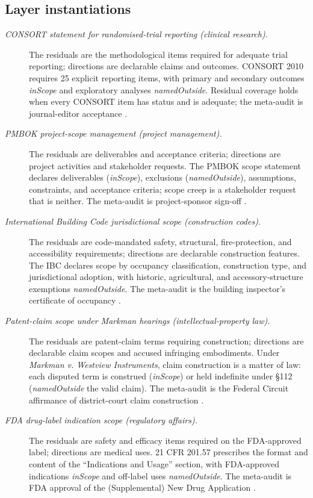 \documentclass[11pt]{article}
\theoremstyle{definition}
\begin{document}
\subsection*{Layer instantiations}\label{layer-inst:F52}

\begin{description}
\item[\emph{{CONSORT} statement for randomised-trial
reporting (clinical research).}]
The residuals are the methodological items required
for adequate trial reporting; directions are
declarable claims and outcomes.  CONSORT 2010
requires 25 explicit reporting items, with primary
and secondary outcomes \emph{inScope} and
exploratory analyses \emph{namedOutside}.  Residual
coverage holds when every CONSORT item has status
and is adequate; the meta-audit is journal-editor
acceptance \citep{Schulz2010CONSORT}.

\item[\emph{{PMBOK} project-scope management
(project management).}]
The residuals are deliverables and acceptance
criteria; directions are project activities and
stakeholder requests.  The PMBOK scope statement
declares deliverables (\emph{inScope}), exclusions
(\emph{namedOutside}), assumptions, constraints,
and acceptance criteria; scope creep is a
stakeholder request that is neither.  The
meta-audit is project-sponsor sign-off
\citep{PMI2017PMBOK}.

\item[\emph{International Building Code
jurisdictional scope (construction codes).}]
The residuals are code-mandated safety,
structural, fire-protection, and accessibility
requirements; directions are declarable
construction features.  The IBC declares scope by
occupancy classification, construction type, and
jurisdictional adoption, with historic, agricultural,
and accessory-structure exemptions
\emph{namedOutside}.  The meta-audit is the
building inspector's certificate of occupancy
\citep{ICC2021IBC}.

\item[\emph{Patent-claim scope under {M}arkman
hearings (intellectual-property law).}]
The residuals are patent-claim terms requiring
construction; directions are declarable claim
scopes and accused infringing embodiments.  Under
\emph{Markman v. Westview Instruments}, claim
construction is a matter of law: each disputed term
is construed (\emph{inScope}) or held indefinite
under \S112 (\emph{namedOutside} the valid claim).
The meta-audit is the Federal Circuit affirmance of
district-court claim construction
\citep{Markman1996Westview}.

\item[\emph{{FDA} drug-label indication scope
(regulatory affairs).}]
The residuals are safety and efficacy items required
on the FDA-approved label; directions are medical
uses.  21 CFR 201.57 prescribes the format and
content of the ``Indications and Usage'' section,
with FDA-approved indications \emph{inScope} and
off-label uses \emph{namedOutside}.  The meta-audit
is FDA approval of the (Supplemental) New Drug
Application \citep{FDA21CFR20157}.
\end{description}
\end{document}

